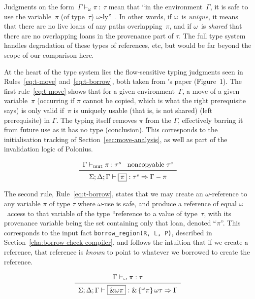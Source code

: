 \documentclass[11pt,a4paper,twoside,openany]{report}
\newcommand{\InDatalog}[1]{\texttt{#1}}
\newcommand{\expression}[1]{\boxed{#1}}
\newcommand{\ntyperule}[2]{\begin{array}{c}#1\\\midrule\raisebox{1pt}{\strut}#2\end{array}}
\renewcommand\_{\textunderscore\allowbreak}
\begin{document}
Judgments on the form~$\Gamma \vdash_{\omega} \pi \: : \: \tau$ mean that ``in
the environment~$\Gamma$, it is safe to use the variable~$\pi$ (of type~$\tau$)
$\omega$-ly''~\cite{weiss_oxide:_2019}. In other words, if $\omega$~is
\emph{unique}, it means that there are no live loans of any paths
overlapping~$\pi$, and if $\omega$~is \emph{shared} that there are no
overlapping loans in the provenance part of $\tau$. The full type system handles
degradation of these types of references, etc, but would be far beyond the scope
of our comparison here.

At the heart of the type system lies the flow-sensitive typing judgments seen in
Rules~\ref{eq:t-move} and~\ref{eq:t-borrow}, both taken from
\citeauthor*{weiss_oxide:_2019}'s paper (Figure~1). The first
rule~\eqref{eq:t-move} shows that for a given environment~$\Gamma$, a move of a
given variable~$\pi$ (occurring if $\pi$ cannot be copied, which is what the
right prerequisite says) is only valid if~$\pi$ is uniquely usable (that is, is
not shared) (left prerequisite) in $\Gamma$. The typing itself removes $\pi$
from the $\Gamma$, effectively barring it from future use as it has no type
(conclusion). This corresponds to the initialisation tracking of
Section~\ref{sec:move-analysis}, as well as part of the invalidation logic
of Polonius.

\begin{equation}\label{eq:t-move}
  \ntyperule{
    \Gamma \vdash_{\text{mut}} \pi : \tau^s \:\:\:\:
    \text{noncopyable } \tau^s}
  {
    \Sigma ; \Delta ; \Gamma \vdash \expression{\pi} : \tau^s \Rightarrow \Gamma - \pi
  }
\end{equation}

The second rule, Rule~\eqref{eq:t-borrow}, states that we may create an
$\omega$-reference to any variable $\pi$ of type $\tau$ where $\omega$-use is
safe, and produce a reference of equal $\omega$~access to that variable of the
type ``reference to a value of type~$\tau$, with its provenance variable being
the set containing only that loan, denoted $^{\omega}\pi$''. This corresponds to
the input fact \InDatalog{borrow_region(R, L, P)}, described in
Section~\ref{cha:borrow-check-compiler}, and follows the intuition that if we
create a reference, that reference is \emph{known} to point to whatever we
borrowed to create the reference.

\begin{equation}\label{eq:t-borrow}
  \ntyperule{
    \Gamma \vdash_{\omega} \pi : \tau}
  {
    \Sigma ; \Delta ; \Gamma \vdash \expression{\&\omega \pi} : \& \left \{ ^{\omega}\pi\right \} \omega \tau \Rightarrow \Gamma
  }
\end{equation}
\end{document}
